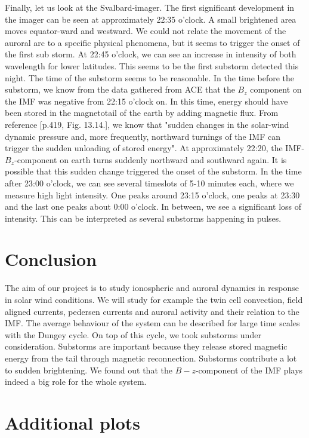 \documentclass[10pt,a4paper]{article}
\begin{document}
Finally, let us look at the Svalbard-imager. The first significant development in the imager can be seen at approximately 22:35 o'clock. A small brightened area moves equator-ward and westward. We could not relate the movement of the auroral arc to a specific physical phenomena, but it seems to trigger the onset of the first sub storm. At 22:45 o'clock, we can see an increase in intensity of both wavelength for lower latitudes. This seems to be the first substorm detected this 
night. The time of the substorm seems to be reasonable. In the time before the substorm, we know from the data gathered from ACE that the $B_z$ component on the IMF was negative from 22:15 o'clock on. In this time, energy should have been stored in the magnetotail of the earth by adding magnetic flux. 
From reference \cite{Buch2}[p.419, Fig. 13.14.], we know that "sudden changes in the solar-wind dynamic pressure and, more frequently, northward turnings of the IMF can trigger the sudden unloading of stored energy". At approximately 22:20, the IMF-$B_z$-component on earth turns suddenly northward and southward again. It is possible that this sudden change triggered the onset of the substorm. In the time after 23:00 o'clock, we can see several timeslots of 5-10 minutes each, where we measure 
high light intensity. One peaks around 23:15 o'clock, one peaks at 23:30 and the last one peaks about 0:00 o'clock. In between, we see a significant loss of intensity. 
This can be interpreted as several substorms happening in pulses. 

\section{Conclusion}

The aim of our project is to study ionospheric and auroral dynamics in response in solar wind conditions. We will study for example the twin cell convection, field aligned currents, pedersen currents and auroral activity and their relation to the IMF. 
The average behaviour of the system can be described for large time scales with the Dungey cycle. On top of this cycle, we took substorms under consideration. Substorms are important because they release stored magnetic energy from the tail through magnetic reconnection. Substorms contribute a lot to sudden brightening. 
We found out that the $B-z$-component of the IMF plays indeed a big role for the whole system. 


\newpage
\section{Additional plots}
\end{document}
